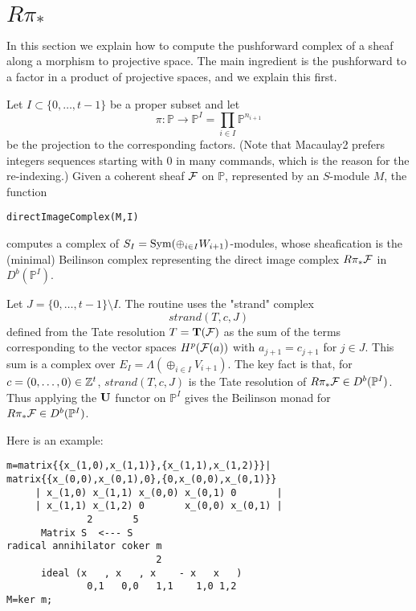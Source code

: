 \documentclass[twoside,12pt, leqno]{amsart}
\def\PP{{\mathbb P}}
\def\bT{{\bf T}}
\def\bU{{\bf U}}
\begin{document}
\section{$R\pi_*$}\label{sec:push forward}

In this section we explain how to compute the pushforward complex of a sheaf along a morphism
to projective space. The main ingredient is the pushforward to a factor in a product of projective
spaces, and we explain this first.

Let $I \subset \{0,\ldots,t-1 \}$ be a proper subset and let
$$ \pi \colon\PP \to  \PP^I=\prod_{i \in  I} \PP^{n_{i+1}}$$
be the projection to the corresponding factors. (Note that Macaulay2 prefers integers sequences starting with $0$ in many commands, which is the reason for the re-indexing.) Given a coherent sheaf ${\mathcal F}$ on $\PP$, represented by an $S$-module $M$,
the function
{\small \begin{verbatim}
directImageComplex(M,I)
\end{verbatim}}
\noindent computes a complex of $S_I = \operatorname{Sym} (\oplus_{i \in I} W_{i+1})$-modules, whose sheafication
is the (minimal) Beilinson complex representing the direct image complex $R\pi_* {\mathcal F}$ in $D^b(\PP^I)$. 

Let $J=\{0,\ldots,t-1\} \setminus I$.
The routine uses 
the "strand" complex
$$
strand(T,c,J)
$$
defined from the Tate resolution $T=\bT(\sF)$ as the sum of the terms
corresponding to the vector spaces $H^p({\mathcal F}(a))$ with $a_{j+1}=c_{j+1}$ for $j \in J$.
This sum is a complex over $E_I= \Lambda( \oplus_{i\in I} V_{i+1})$.
 The key fact is that, for $c=(0,\dots,0) \in {\mathbb Z}^t$, 
 $
strand(T,c,J)
$
 is the Tate resolution of $R\pi_* \sF \in D^b(\PP^I)$.
Thus applying the $\bU$ functor on $\PP^I$
gives the Beilinson monad for $R\pi_* \sF \in D^b(\PP^I)$.

Here is an example:
{\small \begin{verbatim}
m=matrix{{x_(1,0),x_(1,1)},{x_(1,1),x_(1,2)}}|
matrix{{x_(0,0),x_(0,1),0},{0,x_(0,0),x_(0,1)}}
     | x_(1,0) x_(1,1) x_(0,0) x_(0,1) 0       |
     | x_(1,1) x_(1,2) 0       x_(0,0) x_(0,1) |
              2       5
      Matrix S  <--- S
radical annihilator coker m
                          2
      ideal (x   , x   , x    - x   x   )
              0,1   0,0   1,1    1,0 1,2
M=ker m;
\end{verbatim}}
 
\end{document}
